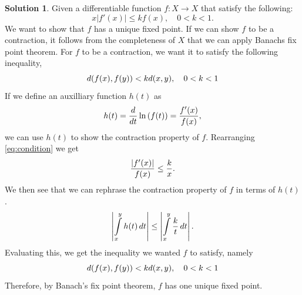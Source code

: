 \documentclass[a4paper]{article}
\theoremstyle{definition}
\newtheorem{sol}{Solution}
\begin{document}
\begin{sol}
Given a differentiable function $f: X \longrightarrow X$ that satisfy the
following:
\begin{equation}
  \label{eq:condition}
  x\left|f'(x)\right| \leq kf(x), \quad 0 < k < 1.
\end{equation}
We want to show that $f$ has a unique fixed point.  If we can show $f$ to be a
contraction, it follows from the completeness of $X$ that we can apply Banachs
fix point theorem.  For $f$ to be a contraction, we want it to satisfy the
following inequality,
\begin{equation}
  \notag
  d(f(x), f(y)) < kd(x, y), \quad 0 < k < 1
\end{equation}
If we define an auxilliary function $h(t)$ as
\begin{equation}
  \notag
  h(t) = \frac{d}{dt} \ln\left(f(t)\right)  = \frac{f'(x)}{f(x)}, 
\end{equation} 
we can use $h(t)$ to show the contraction property of $f$. Rearranging
\eqref{eq:condition} we get
\begin{equation}
  \notag
  \frac{\left| f'(x)\right|}{f(x)} \leq \frac{k}{x}.
\end{equation}
We then see that we can rephrase the contraction property of $f$ in terms of $h(t)$.
\begin{equation}
  \notag
  \left| \int\limits_{x}^{y} h(t) \, dt  \right|  \leq \left| \int\limits_{x}^{y} \frac{k}{t} \, dt \right|.
\end{equation}
Evaluating this, we get the inequality we wanted $f$ to satisfy, namely
\begin{equation}
  \notag
  d(f(x), f(y)) < kd(x, y), \quad 0 < k < 1
  \end{equation}
  Therefore, by Banach's fix point theorem, $f$ has one unique fixed point.
\end{sol}
\end{document}
